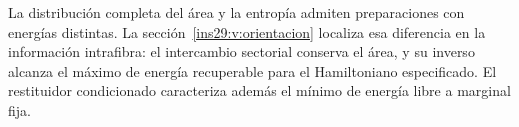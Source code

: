 La distribución completa del área y la entropía admiten preparaciones con
energías distintas. La sección~\ref{ins29:v:orientacion} localiza esa
diferencia en la información intrafibra: el intercambio sectorial conserva
el área, y su inverso alcanza el máximo de energía recuperable para el
Hamiltoniano especificado. El restituidor condicionado caracteriza además
el mínimo de energía libre a marginal fija.

